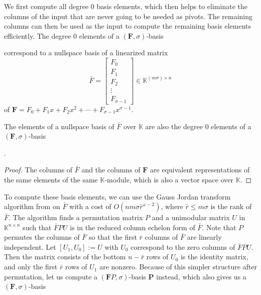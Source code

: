 We first compute all degree 0 basis elements, which then helps to
eliminate the columns of the input that are never going to be needed
as pivots. The remaining columns can then be used as the input to
compute the remaining basis elements efficiently. The degree 0 elements
of a $\left(\mathbf{F},\sigma\right)$-basis%
\begin{comment}
nullspace basis elements of $\mathbf{F}$
\end{comment}
{} correspond to a nullspace basis of a linearized matrix 
\[
\bar{F}=\left[\begin{array}{c}
F_{0}\\
F_{1}\\
F_{2}\\
\vdots\\
F_{\sigma-1}
\end{array}\right]\in\mathbb{K}^{(m\sigma)\times n}
\]
of $\mathbf{F}=F_{0}+F_{1}x+F_{2}x^{2}+\cdots+F_{\sigma-1}x^{\sigma-1}$.
\begin{lem}
The elements of a nullspace basis of $\bar{F}$ over $\mathbb{K}$
are also the degree 0 elements of a $\left(\mathbf{F},\sigma\right)$-basis%
\begin{comment}
a minimal nullspace basis of $\mathbf{F}$
\end{comment}
.\end{lem}
\begin{proof}
The columns of $\bar{F}$ and the columns of $\mathbf{F}$ are equivalent
representations of the same elements of the same $\mathbb{K}$-module,
which is also a vector space over $\mathbb{K}$.
\end{proof}
To compute these basis elements, we can use the Gauss Jordan transform
algorithm from \citet{storjohann:phd2000} on $\bar{F}$ with a cost
of $O\left(nm\sigma\bar{r}^{\omega-2}\right)$, where $\bar{r}\le m\sigma$
is the rank of $\bar{F}$. The algorithm finds a permutation matrix
$P$ and a unimodular matrix $U$ in $\mathbb{K}^{n\times n}$ such
that $\bar{F}PU$ is in the reduced column echelon form of $\bar{F}$.
Note that $P$ permutes the columns of $\bar{F}$ so that the first
$\bar{r}$ columns of $\bar{F}$ are linearly independent. Let $\left[U_{1},U_{0}\right]:=U$
with $U_{0}$ correspond to the zero columns of $\bar{F}PU$. Then
the matrix consists of the bottom $n-\bar{r}$ rows of $U_{0}$ is
the identity matrix, and only the first $\bar{r}$ rows of $U_{1}$
are nonzero. Because of this simpler structure after permutation,
let us compute a $\left(\mathbf{F}P,\sigma\right)$-basis $\mathbf{P}$
instead, which also gives us a $\left(\mathbf{F},\sigma\right)$-basis
